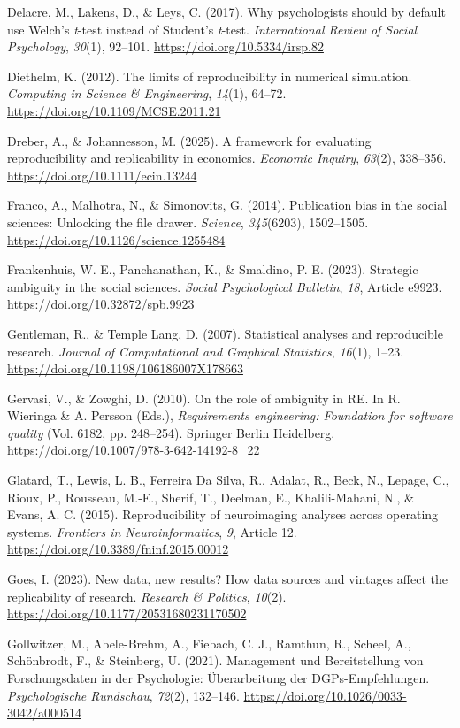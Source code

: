 \documentclass[authordate, meta]{jote-new-article}
\begin{document}
	Delacre, M., Lakens, D., \& Leys, C. (2017). Why psychologists should by default use Welch's \emph{t}-test instead of Student's \emph{t}-test. \emph{International Review of Social Psychology}, \emph{30}(1), 92--101. \url{https://doi.org/10.5334/irsp.82}


	Diethelm, K. (2012). The limits of reproducibility in numerical simulation. \emph{Computing in Science \& Engineering}, \emph{14}(1), 64--72. \url{https://doi.org/10.1109/MCSE.2011.21}


	Dreber, A., \& Johannesson, M. (2025). A framework for evaluating reproducibility and replicability in economics. \emph{Economic Inquiry}, \emph{63}(2), 338--356. \url{https://doi.org/10.1111/ecin.13244}


	Franco, A., Malhotra, N., \& Simonovits, G. (2014). Publication bias in the social sciences: Unlocking the file drawer. \emph{Science}, \emph{345}(6203), 1502--1505. \url{https://doi.org/10.1126/science.1255484}


	Frankenhuis, W. E., Panchanathan, K., \& Smaldino, P. E. (2023). Strategic ambiguity in the social sciences. \emph{Social Psychological Bulletin}, \emph{18}, Article e9923. \url{https://doi.org/10.32872/spb.9923}


	Gentleman, R., \& Temple Lang, D. (2007). Statistical analyses and reproducible research. \emph{Journal of Computational and Graphical Statistics}, \emph{16}(1), 1--23. \url{https://doi.org/10.1198/106186007X178663}


	Gervasi, V., \& Zowghi, D. (2010). On the role of ambiguity in RE. In R. Wieringa \& A. Persson (Eds.), \emph{Requirements engineering: Foundation for software quality} (Vol. 6182, pp. 248--254). Springer Berlin Heidelberg. \url{https://doi.org/10.1007/978-3-642-14192-8\_22}


	Glatard, T., Lewis, L. B., Ferreira Da Silva, R., Adalat, R., Beck, N., Lepage, C., Rioux, P., Rousseau, M.-E., Sherif, T., Deelman, E., Khalili-Mahani, N., \& Evans, A. C. (2015). Reproducibility of neuroimaging analyses across operating systems. \emph{Frontiers in Neuroinformatics}, \emph{9}, Article 12. \url{https://doi.org/10.3389/fninf.2015.00012}


	Goes, I. (2023). New data, new results? How data sources and vintages affect the replicability of research. \emph{Research \& Politics}, \emph{10}(2). \url{https://doi.org/10.1177/20531680231170502}


	Gollwitzer, M., Abele-Brehm, A., Fiebach, C. J., Ramthun, R., Scheel, A., Schönbrodt, F., \& Steinberg, U. (2021). Management und Bereitstellung von Forschungsdaten in der Psychologie: Überarbeitung der DGPs-Empfehlungen. \emph{Psychologische Rundschau}, \emph{72}(2), 132--146. \url{https://doi.org/10.1026/0033-3042/a000514}
\end{document}
